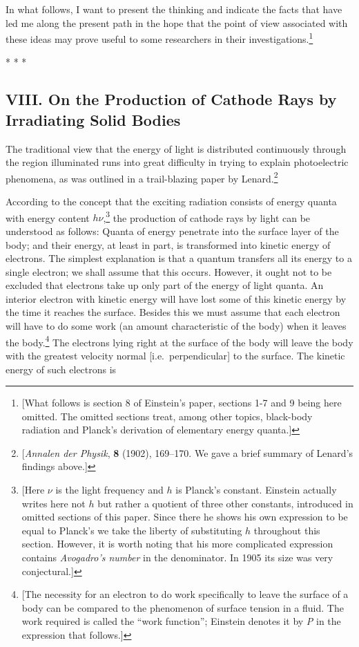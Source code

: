 In what follows, I want to present the thinking and indicate the facts
that have led me along the present path in the hope that the point of
view associated with these ideas may prove useful to some researchers in
their investigations.\footnote{{[}What follows is section 8 of
  Einstein's paper, sections 1-7 and 9 being here omitted. The omitted
  sections treat, among other topics, black-body radiation and Planck's
  derivation of elementary energy quanta.{]}}\\
\centerline{* * *}
%
\subsection*{VIII. On the Production of Cathode Rays by Irradiating Solid Bodies}

The traditional view that the energy of light is distributed
continuously through the region illuminated runs into great difficulty
in trying to explain photoelectric phenomena, as was outlined in a
trail-blazing paper by Lenard.\footnote{{[}\emph{Annalen der Physik}, \textbf{8}
  (1902), 169--170. We gave a brief summary of Lenard's findings above.{]}}

According to the concept that the exciting radiation consists of energy
quanta with energy content $h\nu$,\footnote{{[}Here $\nu$ is the
  light frequency and $h$ is Planck's constant. Einstein actually
  writes here not $h$ but rather a quotient of three other
  constants, introduced in omitted sections of this paper. Since there
  he shows his own expression to be equal to Planck's we take the
  liberty of substituting $h$ throughout this section. However, it
  is worth noting that his more complicated expression contains
  \emph{Avogadro's number} in the denominator. In 1905 its size was very
  conjectural.{]}} the production of cathode rays by light can be
understood as follows: Quanta of energy penetrate into the surface layer
of the body; and their energy, at least in part, is transformed into
kinetic energy of electrons. The simplest explanation is that a quantum
transfers all its energy to a single electron; we shall assume that this
occurs. However, it ought not to be excluded that electrons take up only
part of the energy of light quanta. An interior electron with kinetic
energy will have lost some of this kinetic energy by the time it reaches
the surface. Besides this we must assume that each electron will have to
do some work (an amount characteristic of the body) when it leaves the
body.\footnote{{[}The necessity for an electron to do work specifically
  to leave the surface of a body can be compared to the phenomenon of
  surface tension in a fluid. The work required is called the ``work
  function''; Einstein denotes it by \emph{P} in the expression that
  follows.{]}} The electrons lying right at the surface of the body will
leave the body with the greatest velocity normal {[}i.e.\
perpendicular{]} to the surface. The kinetic energy of such electrons is

